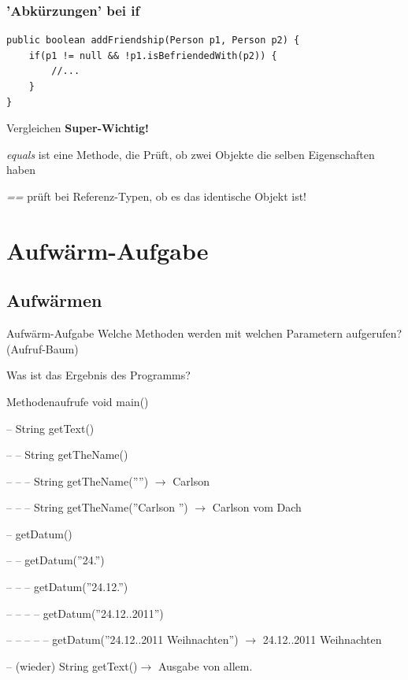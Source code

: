 \documentclass[18pt]{beamer}
\begin{document}
\begin{frame}[containsverbatim]
	\frametitle{'Abkürzungen' bei if}
	\begin{lstlisting}
public boolean addFriendship(Person p1, Person p2) {
	if(p1 != null && !p1.isBefriendedWith(p2)) {
		//...
	}
}
	\end{lstlisting}
\end{frame}


\begin{frame}{Vergleichen}
	\textbf{Super-Wichtig!}
	
	\emph{equals} ist eine Methode, die Prüft, ob zwei Objekte die selben Eigenschaften haben
	
	\emph{==} prüft bei Referenz-Typen, ob es das identische Objekt ist!
\end{frame}

\section{Aufwärm-Aufgabe}
\subsection{Aufwärmen}
\begin{frame}{Aufwärm-Aufgabe}
	Welche Methoden werden mit welchen Parametern aufgerufen? (Aufruf-Baum)
	
	Was ist das Ergebnis des Programms?
\end{frame}


\begin{frame}{Methodenaufrufe}
	void main()\pause
	
	-- String getText()\pause
	
	-- -- String getTheName()\pause
	
	-- -- -- String getTheName('''') $\rightarrow$ Carlson\pause
	
	-- -- -- String getTheName(''Carlson '') $\rightarrow$ Carlson vom Dach\pause
	
	-- getDatum()\pause
	
	-- -- getDatum(''24.'')\pause
	
	-- -- -- getDatum(''24.12.'')\pause
	
	-- -- -- -- getDatum(''24.12..2011'') \pause
	
	-- -- -- -- -- getDatum(''24.12..2011 Weihnachten'') $\rightarrow$ 24.12..2011 Weihnachten\pause
	
	-- (wieder) String getText()$\rightarrow$ Ausgabe von allem.
\end{frame}
\end{document}
